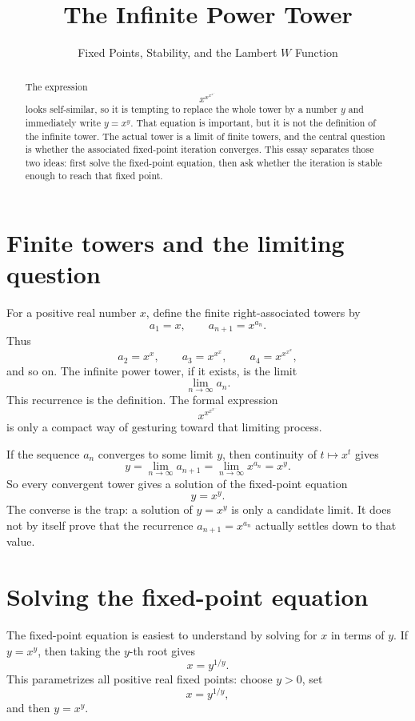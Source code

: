 \documentclass{essay}
\title{The Infinite Power Tower}
\subtitle{Fixed Points, Stability, and the Lambert \(W\) Function}
\author{}
\date{}
\begin{document}
\maketitle

\begin{abstract}
  \noindent The expression
  \[ x^{x^{x^{x^{\cdots}}}} \]
  looks self-similar, so it is tempting to replace the whole tower by a
  number \(y\) and immediately write \(y=x^{y}\). That equation is important,
  but it is not the definition of the infinite tower. The actual tower is a
  limit of finite towers, and the central question is whether the associated
  fixed-point iteration converges. This essay separates those two ideas:
  first solve the fixed-point equation, then ask whether the iteration is
  stable enough to reach that fixed point.
\end{abstract}

\section{Finite towers and the limiting question}

For a positive real number \(x\), define the finite right-associated towers by
\[ a_{1}=x,\qquad a_{n+1}=x^{a_{n}}. \]
Thus
\[ a_{2}=x^{x},\qquad a_{3}=x^{x^{x}},\qquad a_{4}=x^{x^{x^{x}}}, \]
and so on. The infinite power tower, if it exists, is the limit
\[ \lim_{n\to\infty} a_{n}. \]
This recurrence is the definition. The formal expression
\[ x^{x^{x^{x^{\cdots}}}} \]
is only a compact way of gesturing toward that limiting process.

If the sequence \(a_{n}\) converges to some limit \(y\), then continuity of
\(t\mapsto x^{t}\) gives
\[ y=\lim_{n\to\infty}a_{n+1} =\lim_{n\to\infty}x^{a_{n}} =x^{y}. \]
So every convergent tower gives a solution of the fixed-point equation
\[ y=x^{y}. \]
The converse is the trap: a solution of \(y=x^{y}\) is only a candidate limit.
It does not by itself prove that the recurrence \(a_{n+1}=x^{a_{n}}\) actually
settles down to that value.

\section{Solving the fixed-point equation}

The fixed-point equation is easiest to understand by solving for \(x\) in
terms of \(y\). If \(y=x^{y}\), then taking the \(y\)-th root gives
\[ x=y^{1/y}. \]
This parametrizes all positive real fixed points: choose \(y>0\), set
\[ x=y^{1/y}, \]
and then \(y=x^{y}\).
\end{document}
